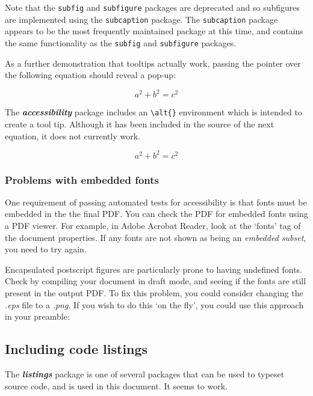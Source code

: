 \documentclass[10pt,twocolumn]{article}
\newcommand{\packagename}[1]{\textbf{\emph{#1}}}
\begin{document}
Note that the \texttt{subfig} and \texttt{subfigure} packages are deprecated and so subfigures are implemented using the \texttt{subcaption} package. The \texttt{subcaption} package appears to be the most frequently maintained package at this time, and contains the same functionality as the \texttt{subfig} and \texttt{subfigure} packages.

As a further demonstration that tooltips actually work, passing the pointer over the following equation should reveal a pop-up:

\begin{equation}
	a^2+b^2=c^2
\end{equation}

The \packagename{accessibility} package includes an \verb+\alt{}+ environment which is intended to create a tool tip. Although it has been included in the source of the next equation, it does not currently work.

\begin{equation}
	a^2+b^2=c^2
\end{equation}

\subsubsection{Problems with embedded fonts}
One requirement of passing automated tests for accessibility is that fonts must be embedded in the the final PDF. You can check the PDF for embedded fonts using a PDF viewer. For example, in Adobe Acrobat Reader, look at the `fonts' tag of the document properties. If any fonts are not shown as being an \emph{embedded subset}, you need to try again. 

Encapsulated postscript figures are particularly prone to having undefined fonts. Check by compiling your document in draft mode, and seeing if the fonts are still present in the output PDF. To fix this problem, you could consider changing the \emph{.eps} file to a \emph{.png}. If you wish to do this `on the fly', you could use this approach in your preamble:


\subsection{Including code listings}
The \packagename{listings} package is one of several packages that can be used to typeset source code, and is used in this document. It seems to work.
\end{document}
